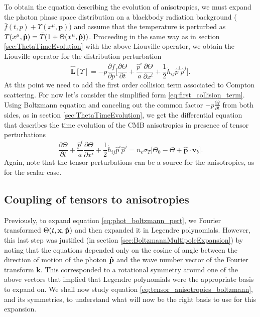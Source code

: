 To obtain the equation describing the evolution of anisotropies, we must expand the photon phase space distribution on a blackbody radiation background ($\bar{f}(t,p)+\Upsilon(x^\mu,\mathbf p) $) and assume that the temperature is perturbed as $T(x^\mu,\mathbf{\hat{p}})=\bar T (1+\Theta(x^\mu,\mathbf{\hat{p}}))$. Proceeding in the same way as in section \ref{sec:ThetaTimeEvolution} with the above Liouville operator, we obtain the Liouville operator for the distribution perturbation 
$$\hat{\mathbf{L}}[\Upsilon]=-p\frac{\partial \bar f}{\partial p}\bigg[\frac{\partial \Theta}{\partial t}+\frac{\hat p^i}{a}\frac{\partial \Theta}{\partial x^i}+\frac{1}{2}\dot{h}_{ij}\hat p^i\hat p^j\bigg].$$
At this point we need to add the first order collision term associated to Compton scattering. For now let's consider the simplified form \eqref{eq:first_collision_term}. Using Boltzmann equation and canceling out the common factor $-p\frac{\partial\bar f}{\partial t}$ from both sides, as in section \ref{sec:ThetaTimeEvolution}, we get the differential equation that describes the time evolution of the CMB anisotropies in presence of tensor perturbations
\begin{equation}
    \label{eq:tensor_anisotropies_boltzmann}
    \frac{\partial \Theta}{\partial t}+\frac{\hat p^i}{a}\frac{\partial \Theta}{\partial x^i}+\frac{1}{2}\dot{h}_{ij}\hat p^i\hat p^j=n_{e}\sigma_T\bigg[\Theta_0-\Theta+\mathbf{\hat{p}}\cdot\mathbf{v}_{b}\bigg].
\end{equation}
Again, note that the tensor perturbations can be a source for the anisotropies, as for the scalar case.
\subsection{Coupling of tensors to anisotropies}
Previously, to expand equation \eqref{eq:phot_boltzmann_pert}, we Fourier transformed $\Theta(t,\mathbf{x},\mathbf{\hat{p}})$ and then expanded it in Legendre polynomials. However, this last step was justified (in section \ref{sec:BoltzmannMultipoleExpansion}) by noting that the equations depended only on the cosine of angle between the direction of motion of the photon $\mathbf{\hat{p}}$ and the wave number vector of the Fourier transform $\mathbf{k}$. This corresponded to a rotational symmetry around one of the above vectors that implied that Legendre polynomials were the appropriate basis to expand on. We shall now study equation \eqref{eq:tensor_anisotropies_boltzmann}, and its symmetries, to understand  what will now be the right basis to use for this expansion.

